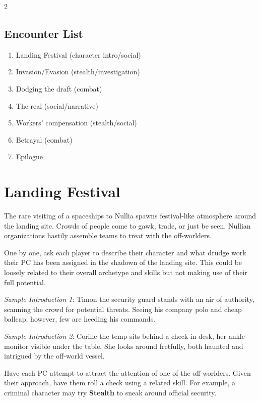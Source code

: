 \documentclass{book}
\newcommand{\df}{\DifficultyDie }
\newcommand{\rt}{{\color{magenta}\textgoth{Rogue} \textswab{Trader}}\xspace}
\begin{document}
\begin{multicols*}{2}
\subsection{Encounter List}
\begin{enumerate}
    \setlength\itemsep{-.5em}
    \item Landing Festival (character intro/social)
    \item Invasion/Evasion (stealth/investigation)
    \item Dodging the draft (combat)
    \item The real \rt (social/narrative)
    \item Workers' compensation (stealth/social)
    \item Betrayal (combat)
    \item Epilogue
\end{enumerate}

\section{Landing Festival}

The rare visiting of a spaceships to Nullia spawns festival-like atmosphere around the landing site.  Crowds of people come to gawk, trade, or just be seen.  Nullian organizations hastily assemble teams to treat with the off-worlders.

One by one, ask each player to describe their character and what drudge work their PC has been assigned in the shadown of the landing site.  This could be loosely related to their overall archetype and skills but not making use of their full potential.

\emph{Sample Introduction 1}: Timon the security guard stands with an air of authority, scanning the crowd for potential threats.  Seeing his company polo and cheap ballcap, however, few are heeding his commands.

\emph{Sample Introduction 2}: Corille the temp sits behind a check-in desk, her ankle-monitor visible under the table.  She looks around fretfully, both haunted and intrigued by the off-world vessel.

    Have each PC attempt to attract the attention of one of the off-worlders.  Given their approach, have them roll a \df\df check using a related skill.  For example, a criminal character may try \df\df \textbf{Stealth} to sneak around official security.


\end{multicols*}
\end{document}
